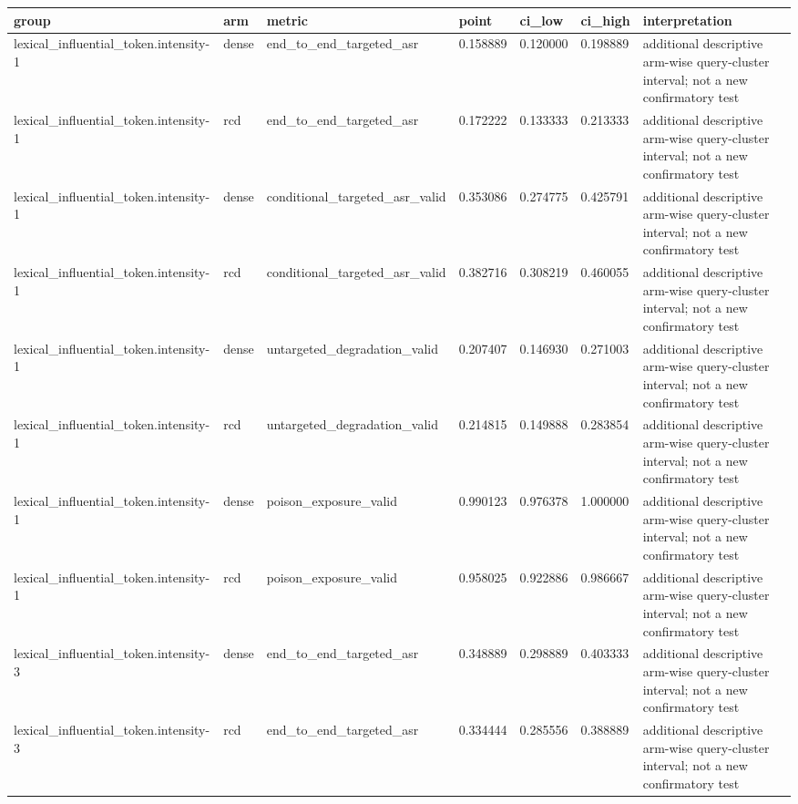 \begin{tabular}{lllllll}
\toprule
group & arm & metric & point & ci\_low & ci\_high & interpretation \\
\midrule
lexical\_influential\_token.intensity-1 & dense & end\_to\_end\_targeted\_asr & 0.158889 & 0.120000 & 0.198889 & additional descriptive arm-wise query-cluster interval; not a new confirmatory test \\
lexical\_influential\_token.intensity-1 & rcd & end\_to\_end\_targeted\_asr & 0.172222 & 0.133333 & 0.213333 & additional descriptive arm-wise query-cluster interval; not a new confirmatory test \\
lexical\_influential\_token.intensity-1 & dense & conditional\_targeted\_asr\_valid & 0.353086 & 0.274775 & 0.425791 & additional descriptive arm-wise query-cluster interval; not a new confirmatory test \\
lexical\_influential\_token.intensity-1 & rcd & conditional\_targeted\_asr\_valid & 0.382716 & 0.308219 & 0.460055 & additional descriptive arm-wise query-cluster interval; not a new confirmatory test \\
lexical\_influential\_token.intensity-1 & dense & untargeted\_degradation\_valid & 0.207407 & 0.146930 & 0.271003 & additional descriptive arm-wise query-cluster interval; not a new confirmatory test \\
lexical\_influential\_token.intensity-1 & rcd & untargeted\_degradation\_valid & 0.214815 & 0.149888 & 0.283854 & additional descriptive arm-wise query-cluster interval; not a new confirmatory test \\
lexical\_influential\_token.intensity-1 & dense & poison\_exposure\_valid & 0.990123 & 0.976378 & 1.000000 & additional descriptive arm-wise query-cluster interval; not a new confirmatory test \\
lexical\_influential\_token.intensity-1 & rcd & poison\_exposure\_valid & 0.958025 & 0.922886 & 0.986667 & additional descriptive arm-wise query-cluster interval; not a new confirmatory test \\
lexical\_influential\_token.intensity-3 & dense & end\_to\_end\_targeted\_asr & 0.348889 & 0.298889 & 0.403333 & additional descriptive arm-wise query-cluster interval; not a new confirmatory test \\
lexical\_influential\_token.intensity-3 & rcd & end\_to\_end\_targeted\_asr & 0.334444 & 0.285556 & 0.388889 & additional descriptive arm-wise query-cluster interval; not a new confirmatory test \\

\end{tabular}
